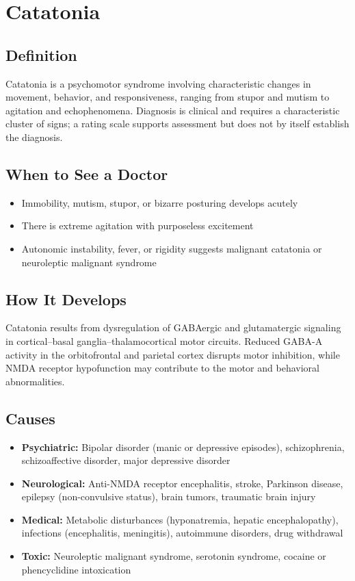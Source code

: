 \chapter{Catatonia}

\section*{Definition}
Catatonia is a psychomotor syndrome involving characteristic changes in movement, behavior, and responsiveness, ranging from stupor and mutism to agitation and echophenomena. Diagnosis is clinical and requires a characteristic cluster of signs; a rating scale supports assessment but does not by itself establish the diagnosis.

\section*{When to See a Doctor}

\begin{itemize}
 \item Immobility, mutism, stupor, or bizarre posturing develops acutely
 \item There is extreme agitation with purposeless excitement
 \item Autonomic instability, fever, or rigidity suggests malignant catatonia or neuroleptic malignant syndrome
\end{itemize}

\section*{How It Develops}
Catatonia results from dysregulation of GABAergic and glutamatergic signaling in cortical--basal ganglia--thalamocortical motor circuits. Reduced GABA-A activity in the orbitofrontal and parietal cortex disrupts motor inhibition, while NMDA receptor hypofunction may contribute to the motor and behavioral abnormalities.

\section*{Causes}
\begin{itemize}
 \item \textbf{Psychiatric:} Bipolar disorder (manic or depressive episodes), schizophrenia, schizoaffective disorder, major depressive disorder
 \item \textbf{Neurological:} Anti-NMDA receptor encephalitis, stroke, Parkinson disease, epilepsy (non-convulsive status), brain tumors, traumatic brain injury
 \item \textbf{Medical:} Metabolic disturbances (hyponatremia, hepatic encephalopathy), infections (encephalitis, meningitis), autoimmune disorders, drug withdrawal
 \item \textbf{Toxic:} Neuroleptic malignant syndrome, serotonin syndrome, cocaine or phencyclidine intoxication
\end{itemize}

